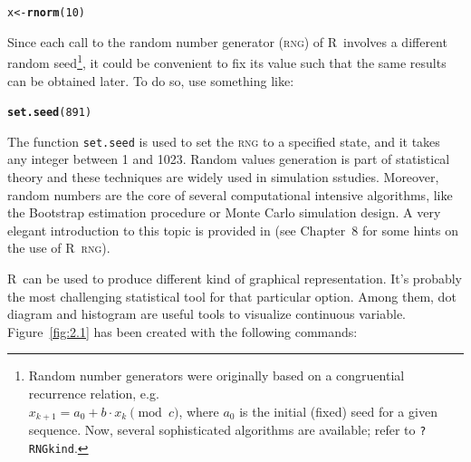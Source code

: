 \documentclass[11pt,a4paper]{memoir}\usepackage[]{graphicx}\usepackage[]{color}
\makeatletter
\newcommand{\hlnum}[1]{\textcolor[rgb]{0.686,0.059,0.569}{#1}}%
\newcommand{\hlstd}[1]{\textcolor[rgb]{0.345,0.345,0.345}{#1}}%
\newcommand{\hlkwb}[1]{\textcolor[rgb]{0.69,0.353,0.396}{#1}}%
\newcommand{\hlkwd}[1]{\textcolor[rgb]{0.737,0.353,0.396}{\textbf{#1}}}%
\newenvironment{kframe}{%
 \def\at@end@of@kframe{}%
 \ifinner\ifhmode%
  \def\at@end@of@kframe{\end{minipage}}%
  \begin{minipage}{\columnwidth}%
 \fi\fi%
 \def\FrameCommand##1{\hskip\@totalleftmargin \hskip-\fboxsep
 \colorbox{shadecolor}{##1}\hskip-\fboxsep
     \hskip-\linewidth \hskip-\@totalleftmargin \hskip\columnwidth}%
 \MakeFramed {\advance\hsize-\width
   \@totalleftmargin\z@ \linewidth\hsize
   \@setminipage}}%
 {\par\unskip\endMakeFramed%
 \at@end@of@kframe}
\newenvironment{knitrout}{}{} %
\newcommand{\R}{\textsf{R}}
\makeatother
\begin{document}
\begin{knitrout}
\color{fgcolor}\begin{kframe}
\begin{alltt}
\hlstd{x} \hlkwb{<-} \hlkwd{rnorm}\hlstd{(}\hlnum{10}\hlstd{)}
\end{alltt}
\end{kframe}
\end{knitrout}

Since each call to the random number generator (\textsc{rng}) of \R\
involves a different random seed\footnote{Random number generators
were originally based on a congruential recurrence relation, e.g.\\
$x_{k+1}=a_0+b\cdot x_k\pmod{c}$, where $a_0$ is the initial (fixed)
seed for a given sequence. Now, several sophisticated algorithms are
available; refer to \texttt{?RNGkind}.}, it could be convenient to fix
its value such that the same results can be obtained later. To do so,
use something like:

\begin{knitrout}
\color{fgcolor}\begin{kframe}
\begin{alltt}
\hlkwd{set.seed}\hlstd{(}\hlnum{891}\hlstd{)}
\end{alltt}
\end{kframe}
\end{knitrout}

The function \texttt{set.seed} is used to set the \textsc{rng} to a
specified state, and it takes any integer between 1 and 1023. Random values
generation is part of statistical theory and these techniques are widely
used in simulation sstudies. Moreover, random numbers are the core of
several computational intensive algorithms, like the Bootstrap estimation
procedure or Monte Carlo simulation design. A very elegant introduction to
this topic is provided in \autocite{Gentle:2003} (see Chapter~8 for some
hints on the use of \R\ \textsc{rng}).

\R\ can be used to produce different kind of graphical
representation. It's probably the most challenging statistical tool
for that particular option.  Among them, dot diagram and histogram are
useful tools to visualize continuous variable. Figure~\ref{fig:2.1}
has been created with the following commands:
\end{document}

